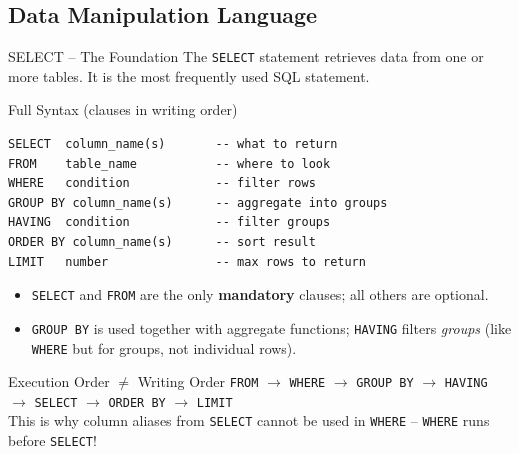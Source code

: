 \subsection{Data Manipulation Language}

\begin{frame}[fragile]{SELECT -- The Foundation}
  The \texttt{SELECT} statement retrieves data from one or more tables.
  It is the most frequently used SQL statement.

  \begin{block}{Full Syntax (clauses in writing order)}
\begin{lstlisting}[style=sqlstyle]
SELECT  column_name(s)       -- what to return
FROM    table_name           -- where to look
WHERE   condition            -- filter rows
GROUP BY column_name(s)      -- aggregate into groups
HAVING  condition            -- filter groups
ORDER BY column_name(s)      -- sort result
LIMIT   number               -- max rows to return
\end{lstlisting}
  \end{block}

  \begin{itemize}
    \item \texttt{SELECT} and \texttt{FROM} are the only \textbf{mandatory}
          clauses; all others are optional.
    \item \texttt{GROUP BY} is used together with aggregate functions;
          \texttt{HAVING} filters \emph{groups} (like \texttt{WHERE} but
          for groups, not individual rows).
  \end{itemize}

  \begin{alertblock}{Execution Order $\neq$ Writing Order}
    \texttt{FROM} $\to$ \texttt{WHERE} $\to$ \texttt{GROUP BY} $\to$
    \texttt{HAVING} $\to$ \texttt{SELECT} $\to$ \texttt{ORDER BY} $\to$
    \texttt{LIMIT}\\[2pt]
    This is why column aliases from \texttt{SELECT} cannot be used in
    \texttt{WHERE} -- \texttt{WHERE} runs before \texttt{SELECT}!
  \end{alertblock}
\end{frame}

